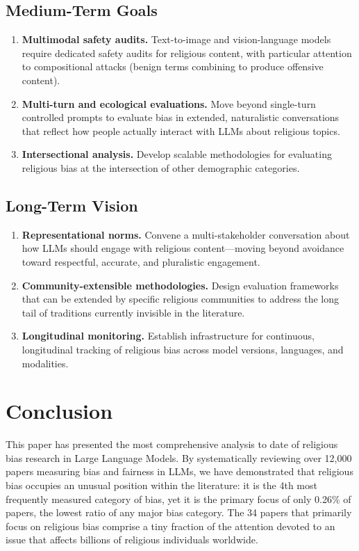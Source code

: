 \documentclass[]{fairmeta}
\begin{document}
\subsection{Medium-Term Goals}

\begin{enumerate}[resume]
    \item \textbf{Multimodal safety audits.} Text-to-image and vision-language models require dedicated safety audits for religious content, with particular attention to compositional attacks (benign terms combining to produce offensive content).
    \item \textbf{Multi-turn and ecological evaluations.} Move beyond single-turn controlled prompts to evaluate bias in extended, naturalistic conversations that reflect how people actually interact with LLMs about religious topics.
    \item \textbf{Intersectional analysis.} Develop scalable methodologies for evaluating religious bias at the intersection of other demographic categories.
\end{enumerate}

\subsection{Long-Term Vision}

\begin{enumerate}[resume]
    \item \textbf{Representational norms.} Convene a multi-stakeholder conversation about how LLMs should engage with religious content---moving beyond avoidance toward respectful, accurate, and pluralistic engagement.
    \item \textbf{Community-extensible methodologies.} Design evaluation frameworks that can be extended by specific religious communities to address the long tail of traditions currently invisible in the literature.
    \item \textbf{Longitudinal monitoring.} Establish infrastructure for continuous, longitudinal tracking of religious bias across model versions, languages, and modalities.
\end{enumerate}


\section{Conclusion}

This paper has presented the most comprehensive analysis to date of religious bias research in Large Language Models. By systematically reviewing over 12,000 papers measuring bias and fairness in LLMs, we have demonstrated that religious bias occupies an unusual position within the literature: it is the 4th most frequently measured category of bias, yet it is the primary focus of only 0.26\% of papers, the lowest ratio of any major bias category. The 34 papers that primarily focus on religious bias comprise a tiny fraction of the attention devoted to an issue that affects billions of religious individuals worldwide.
\end{document}
